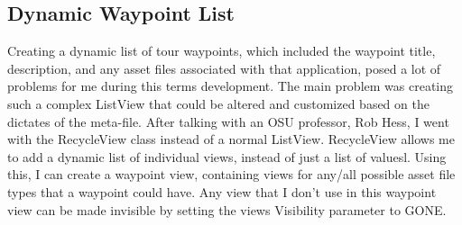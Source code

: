 \documentclass[letterpaper, 10pt,titlepage]{article}
\begin{document}
\subsection{Dynamic Waypoint List}
Creating a dynamic list of tour waypoints, which included the waypoint title, description, and any asset files associated with that application, posed a lot of problems for me during this terms development. The main problem was creating such a complex ListView that could be altered and customized based on the dictates of the meta-file. After talking with an OSU professor, Rob Hess, I went with the RecycleView class instead of a normal ListView. RecycleView allows me to add a dynamic list of individual views, instead of just a list of valuesl. Using this, I can create a waypoint view, containing views for any/all possible asset file types that a waypoint could have. Any view that I don't use in this waypoint view can be made invisible by setting the views Visibility parameter to GONE. 
\end{document}
